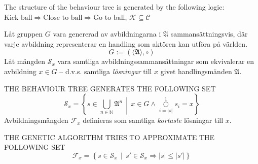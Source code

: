 \documentclass[10pt,a4paper]{article}
\begin{document}
The structure of the behaviour tree is generated by the following logic: \(\text{Kick ball} \Rightarrow \text{Close to ball} \Rightarrow \text{Go to ball}\), \(\mathscr{K} \subseteq \mathscr{C}\)

Låt gruppen \(G\) vara genererad av avbildningarna i \(\mathfrak{A}\) sammansättningsvis, där varje avbildning representerar en handling som aktören kan utföra på världen.
\begin{equation}
		G:=\left(\langle\mathfrak{A}\rangle,\circ\right)
\end{equation}
Låt mängden \(\mathscr{S}_x\) vara samtliga avbildningssammansättningar som ekvivalerar en avbildning \(x\in G\) -- d.v.s. samtliga \textit{lösningar} till \(x\) givet handlingsmänden \(\mathfrak{A}\).

THE BEHAVIOUR TREE GENERATES THE FOLLOWING SET
\begin{equation}
		\mathscr{S}_x = \left\{ s \in \bigcup_{n\in \mathbb{N}}\mathfrak{A}^n \,\middle|\, x\in G\wedge\overset{1}{\underset{i=|s|}\bigcirc} s_i = x \right\}
\end{equation}
Avbildningsmängden \(\mathscr{F}_x\) definieras som samtliga \textit{kortaste} lösningar till \(x\).

THE GENETIC ALGORITHM TRIES TO APPROXIMATE THE FOLLOWING SET \begin{equation}
		\mathscr{F}_x=\left\{s\in\mathscr{S}_x \,\middle|\, s'\in \mathscr{S}_x \Rightarrow |s|\le|s'|\right\}
\end{equation}
\end{document}
